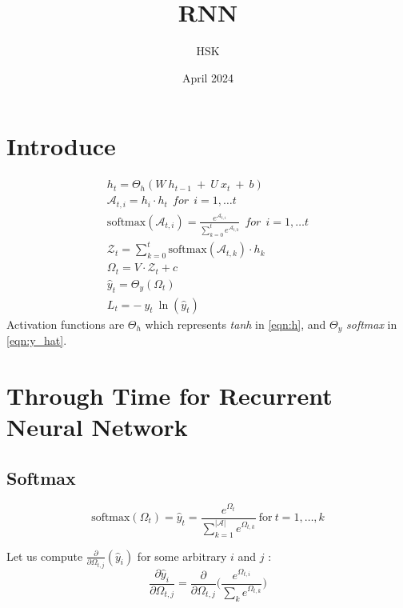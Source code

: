 \documentclass{article}
\title{RNN}
\author{HSK}
\date{April 2024}
\begin{document}
\maketitle
\section{Introduce}

\begin{eqnarray}
\label{eqn:h}
        h_t = \Theta_h(W ~h_{t-1}~+~U~x_t ~+~b)\\
	\mathcal{A}_{t,i} = h_i  \cdot h_t~~for~~ i =1, \ldots t\\
\text{softmax}(\mathcal{A}_{t,i}) = \frac{e^{\mathcal{A}_{t,i }}}{\sum_{k=0}^{t} e^{\mathcal{A}_{t,k}}} ~~for~~ i =1, \ldots t \\
\mathcal{Z}_t = \sum_{k=0}^{t}  \text{softmax}(\mathcal{A}_{t,k}) \cdot h_k \\
\label{eqn:omega}
\Omega_t = V \cdot \mathcal{Z}_t + c\\
\label{eqn:y_hat}
\hat{y}_t = \Theta_y(\Omega_t)\\
\label{eqn:Loss}
        L_t = -~y_t~\ln{(\hat{y}_t)}
\end{eqnarray}
Activation functions are $\Theta_h$ which represents \textit{tanh} in \eqref{eqn:h}, and $\Theta_y$ \textit{softmax} in \eqref{eqn:y_hat}.

\section{Through Time for Recurrent Neural Network}
\subsection{Softmax}
\begin{equation}\nonumber
\text{softmax} (\Omega_{t})=\hat{y}_{t}=\frac{e^{\Omega_t}}{\sum_{k=1}^{|\mathcal{A}|} e^{\Omega_{t,k}}} ~\text{for}~ t=1, \ldots, k
\end{equation}

%
Let us compute $\frac{\partial }{\partial \Omega_{t,j}} (\hat{y}_{i})$ for some arbitrary $i$ and $j$ :
$$
\frac{\partial \hat{y}_{i}}{\partial \Omega_{t,j}}=\frac{\partial}{\partial \Omega_{t,j}}\bigg( \frac{e^{\Omega_{t,i}}}{\sum_{k} e^{\Omega_{t,k}}}\bigg)
$$
\end{document}
